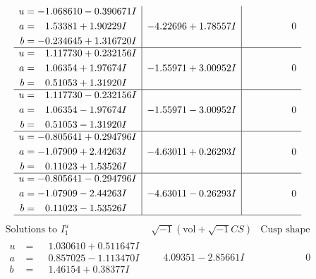 \documentclass[1p]{elsarticle_modified}
\theoremstyle{definition}
\newcommand{\I}{\sqrt{-1}}
\begin{document}
$$\begin{array}{c|c|c}
\begin{aligned}
u &= -1.068610 - 0.390671 I \\
a &= \phantom{-}1.53381 + 1.90229 I \\
b &= -0.234645 + 1.316720 I\end{aligned}
 & -4.22696 + 1.78557 I & \phantom{-0.000000 } 0 \\ \hline\begin{aligned}
u &= \phantom{-}1.117730 + 0.232156 I \\
a &= \phantom{-}1.06354 + 1.97674 I \\
b &= \phantom{-}0.51053 + 1.31920 I\end{aligned}
 & -1.55971 + 3.00952 I & \phantom{-0.000000 } 0 \\ \hline\begin{aligned}
u &= \phantom{-}1.117730 - 0.232156 I \\
a &= \phantom{-}1.06354 - 1.97674 I \\
b &= \phantom{-}0.51053 - 1.31920 I\end{aligned}
 & -1.55971 - 3.00952 I & \phantom{-0.000000 } 0 \\ \hline\begin{aligned}
u &= -0.805641 + 0.294796 I \\
a &= -1.07909 + 2.44263 I \\
b &= \phantom{-}0.11023 + 1.53526 I\end{aligned}
 & -4.63011 + 0.26293 I & \phantom{-0.000000 } 0 \\ \hline\begin{aligned}
u &= -0.805641 - 0.294796 I \\
a &= -1.07909 - 2.44263 I \\
b &= \phantom{-}0.11023 - 1.53526 I\end{aligned}
 & -4.63011 - 0.26293 I & \phantom{-0.000000 } 0\\
 \hline 
 \end{array}$$\newpage$$\begin{array}{c|c|c}  
\text{Solutions to }I^u_{1}& \I (\text{vol} + \sqrt{-1}CS) & \text{Cusp shape}\\
 \hline 
\begin{aligned}
u &= \phantom{-}1.030610 + 0.511647 I \\
a &= \phantom{-}0.857025 - 1.113470 I \\
b &= \phantom{-}1.46154 + 0.38377 I\end{aligned}
 & \phantom{-}4.09351 - 2.85661 I & \phantom{-0.000000 } 0 \\ \hline\begin{aligned}

\end{aligned}
\end{array}$$
\end{document}
